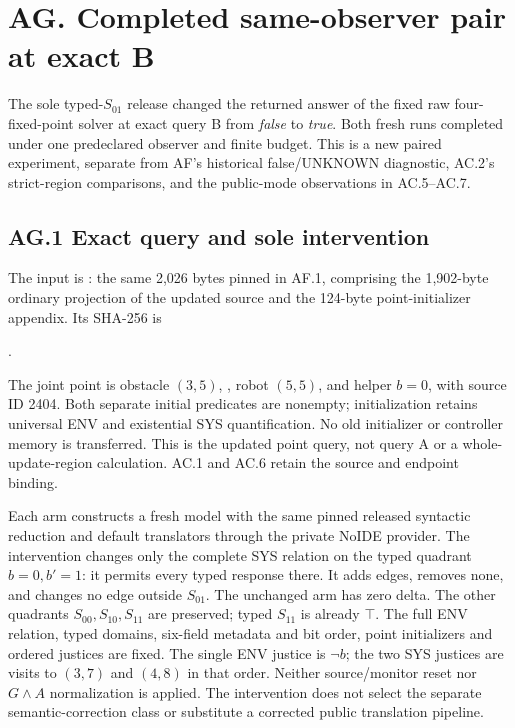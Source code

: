 \clearpage
\section*{AG. Completed same-observer pair at exact B}
\label{supp:r9-completed-pair}

The sole typed-$S_{01}$ release changed the returned answer of the fixed
raw four-fixed-point solver at exact query B from \emph{false} to
\emph{true}. Both fresh runs completed under one predeclared observer and
finite budget. This is a new paired experiment, separate from AF's
historical false/UNKNOWN diagnostic, AC.2's strict-region comparisons,
and the public-mode observations in AC.5--AC.7.

\subsection*{AG.1 Exact query and sole intervention}
The input is : the same 2,026 bytes pinned in
AF.1, comprising the 1,902-byte ordinary projection of the updated source
and the 124-byte point-initializer appendix. Its SHA-256 is
\begin{center}\small
{}.
\end{center}
The joint point is obstacle $(3,5)$, , robot $(5,5)$,
and helper $b=0$, with source ID 2404. Both separate initial predicates
are nonempty; initialization retains universal ENV and existential SYS
quantification. No old initializer or controller memory is transferred.
This is the updated point query, not query A or a whole-update-region
calculation. AC.1 and AC.6 retain the source and endpoint binding.

Each arm constructs a fresh model with the same pinned released syntactic
reduction and default translators through the private NoIDE provider.
The intervention changes only the complete SYS relation on the typed
quadrant $b=0,b'=1$: it permits every typed response there. It adds edges,
removes none, and changes no edge outside $S_{01}$. The unchanged arm has
zero delta. The other quadrants $S_{00},S_{10},S_{11}$ are preserved;
typed $S_{11}$ is already $\top$.
The full ENV relation, typed domains, six-field metadata and bit order,
point initializers and ordered justices are fixed. The single ENV justice
is $\neg b$; the two SYS justices are visits to $(3,7)$ and $(4,8)$ in that
order. Neither source/monitor reset nor $G\land A$ normalization is applied.
The intervention does not select the separate semantic-correction class
or substitute a corrected public translation pipeline.

